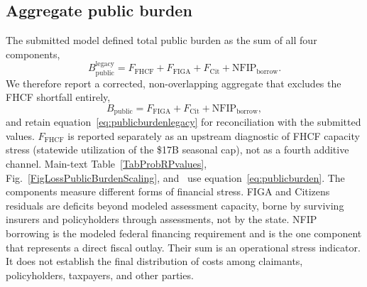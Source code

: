 \subsection*{Aggregate public burden}
The submitted model defined total public burden as the sum of all four components,
\begin{equation}
B_{\mathrm{public}}^{\mathrm{legacy}} = F_{\mathrm{FHCF}} + F_{\mathrm{FIGA}} + F_{\mathrm{Cit}} + \mathrm{NFIP}_{\mathrm{borrow}}.
\label{eq:publicburdenlegacy}
\end{equation}
We therefore report a corrected, non-overlapping aggregate that excludes the FHCF shortfall entirely,
\begin{equation}
B_{\mathrm{public}} = F_{\mathrm{FIGA}} + F_{\mathrm{Cit}} + \mathrm{NFIP}_{\mathrm{borrow}},
\label{eq:publicburden}
\end{equation}
and retain equation~\eqref{eq:publicburdenlegacy} for reconciliation with the submitted values. $F_{\mathrm{FHCF}}$ is reported separately as an upstream diagnostic of FHCF capacity stress (statewide utilization of the \$17B seasonal cap), not as a fourth additive channel. Main-text Table~\ref{TabProbRPvalues}, Fig.~\ref{FigLossPublicBurdenScaling}, and \SITabIII\ use equation~\eqref{eq:publicburden}. The components measure different forms of financial stress. FIGA and Citizens residuals are deficits beyond modeled assessment capacity, borne by surviving insurers and policyholders through assessments, not by the state. NFIP borrowing is the modeled federal financing requirement and is the one component that represents a direct fiscal outlay. Their sum is an operational stress indicator. It does not establish the final distribution of costs among claimants, policyholders, taxpayers, and other parties.

